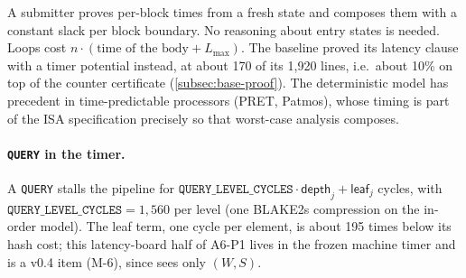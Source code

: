 A submitter proves per-block times from a fresh state and composes them with a constant slack per
block boundary. No reasoning about entry states is needed. Loops cost $n\cdot(\text{time of the
body}+L_{\max})$. The baseline proved its latency clause with a timer potential instead, at about 170
of its 1{,}920 lines, i.e.\ about 10\% on top of the counter certificate (\cref{subsec:base-proof}). The
deterministic model has precedent in time-predictable processors (PRET, Patmos), whose timing is part of
the ISA specification precisely so that worst-case analysis composes.

\paragraph{\texttt{QUERY} in the timer.} A \texttt{QUERY} stalls the pipeline for
$\mathtt{QUERY\_LEVEL\_CYCLES}\cdot\mathsf{depth}_j+\mathsf{leaf}_j$ cycles, with
$\mathtt{QUERY\_LEVEL\_CYCLES}=1{,}560$ per level (one BLAKE2s compression on the in-order model). The
leaf term, one cycle per element, is about 195 times below its hash cost; this latency-board half of
A6-P1 lives in the frozen machine timer and is a v0.4 item (M-6), since  sees only
$(W,S)$.

